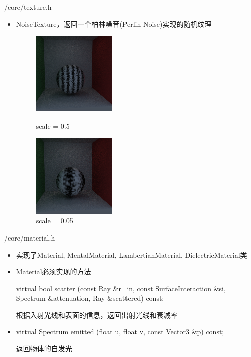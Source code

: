 \documentclass{beamer}
\begin{document}
\begin{frame} {/core/texture.h}
\begin{itemize}
\item NoiseTexture，返回一个柏林噪音(Perlin Noise)实现的随机纹理
\begin{figure}[htbp]
\centering
\begin{minipage}[t]{0.4\textwidth}
\centering
\includegraphics[width=4cm]{noise2}
\caption{scale = 0.5}
\end{minipage}
\begin{minipage}[t]{0.4\textwidth}
\centering
\includegraphics[width=4cm]{noise3}
\caption{scale = 0.05}
\end{minipage}
\end{figure}
\end{itemize}
\end{frame}

\begin{frame} {/core/material.h}
\begin{itemize} [<+->]
\item 实现了Material, MentalMaterial, LambertianMaterial, DielectricMaterial类
\item Material必须实现的方法
\begin{semiverbatim} \small virtual bool scatter \newline (const Ray \&r\_in, const SurfaceInteraction \&si, Spectrum \&attenuation, Ray \&scattered) const; \end{semiverbatim}
根据入射光线和表面的信息，返回出射光线和衰减率
\item 
\begin{semiverbatim} \small virtual Spectrum emitted \newline (float u, float v, const Vector3 \&p) const; \end{semiverbatim}
返回物体的自发光
\end{itemize}
\end{frame}
\end{document}
